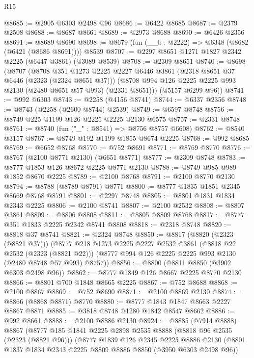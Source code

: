 \begin{lexlean}{R15}
\begin{coremodule}
@8685 := @2905 @6303 @2498 @96
@8686 := @6422 @8685
@8687 := @2379 @2508
@8688 := @8687 @8661
@8689 := @2973 @8688
@8690 := @6426 @2356
@8691 := @8689 @8690
@8698 := @8679 (fun (__b : @2222) => @6348 (@8682 (@6421 (@8686 @8691)))) @8539
@8707 := @2297 @8651 @1271 @1827 @2342 @2225 (@6447 @3861) (@3089 @8539)
@8708 := @2309 @8651
@8740 := @8698
    (@8707
      (@8708
        @351
        @1273
        @2225
        @2227
        @6446
        @3861
        (@2318 @8651 @37 @6446 (@2323 (@2324 @8651 @37)))
        (@8708 @994 @126 @2225 @2225 @993 @2130 (@2480 @8651 @57 @993) (@2331 @8651)))
      (@5157 @6299 @96))
@8741 := @992 @6303
@8743 := @2258 (@4156 @8741)
@8744 := @6337 @2356
@8748 := @8743 (@2258 (@2600 @8744) @2539)
@8749 := @6597 @8748
@8756 := @8749 @225 @1199 @126 @2225 @2225 @2130 @6575
@8757 := @2331 @8748
@8761 := @8740 (fun ("_" : @8541) => @8756 @8757 @6608)
@8762 := @8540 @3157
@8767 := @8749 @192 @1199 @1855 @8674 @2225
@8768 := @992 @8685
@8769 := @6652 @8768
@8770 := @752 @8691
@8771 := @8769 @8770
@8776 := @8767 (@2100 @8771 @2130) (@6651 @8771)
@8777 := @2309 @8748
@8783 := @8777 @1853 @126 @8672 @2225 @8771 @2130
@8788 := @8749 @985 @989 @1852 @8670 @2225
@8789 := @2100 @8768
@8791 := @2100 @8770 @2130
@8794 := @8788 (@8789 @8791) @8771
@8800 := @8777 @1835 @1851 @2345 @8669 @8768 @8791
@8801 := @2297 @8748
@8805 := @8801 @1831 @1834 @2343 @2225
@8806 := @2100 @8741
@8807 := @2100 @2532
@8808 := @8807 @3861
@8809 := @8806 @8808
@8811 := @8805 @8809 @8768
@8817 := @8777 @351 @1833 @2225 @2342 @8741 @8808
@8818 := @2318 @8748
@8820 := @8818 @37 @8741
@8821 := @2324 @8748
@8850 := @8817
    (@8820 (@2323 (@8821 @37)))
    (@8777
      @218
      @1273
      @2225
      @2227
      @2532
      @3861
      (@8818 @22 @2532 (@2323 (@8821 @22)))
      (@8777 @994 @126 @2225 @2225 @993 @2130 (@2480 @8748 @57 @993) @8757))
@8856 := @8800 (@8811 @8850 (@3902 @6303 @2498 @96))
@8862 := @8777 @1849 @126 @8667 @2225 @8770 @2130
@8866 := @8801 @700 @1848 @8665 @2225
@8867 := @752 @8688
@8868 := @2100 @8867
@8869 := @752 @8690
@8871 := @2100 @8869 @2130
@8874 := @8866 (@8868 @8871) @8770
@8880 := @8777 @1843 @1847 @8663 @2227 @8867 @8871
@8885 := @3818 @8748 @1280 @1842 @8547 @8662
@8886 := @992 @8661
@8888 := @2100 @8886 @2130
@8924 := @8885
    (@7914 @8888)
    @8867
    (@8777
      @185
      @1841
      @2225
      @2898
      @2535
      @8888
      (@8818 @96 @2535 (@2323 (@8821 @96)))
      (@8777
        @1839
        @126
        @2345
        @2225
        @8886
        @2130
        (@8801 @1837 @1834 @2343 @2225 @8809 @8886 @8850 (@3950 @6303 @2498 @96))

\end{coremodule}
\end{lexlean}
